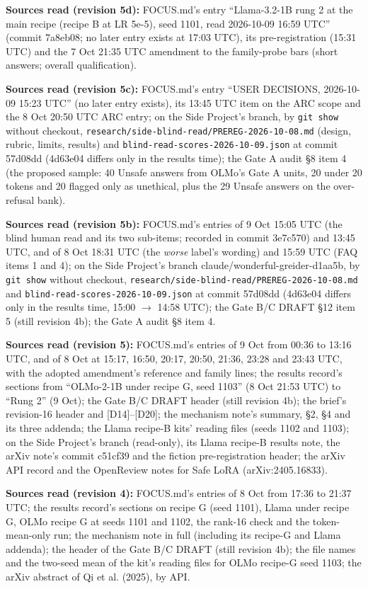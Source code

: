 \documentclass{article}
\theoremstyle{plain}
\theoremstyle{definition}
\theoremstyle{remark}
\begin{document}
\textbf{Sources read (revision 5d):} FOCUS.md's entry ``Llama-3.2-1B rung 2 at
the main recipe (recipe B at LR 5e-5), seed 1101, read 2026-10-09 16:59 UTC''
(commit 7a8eb08; no later entry exists at 17:03 UTC), its pre-registration
(15:31 UTC) and the 7 Oct 21:35 UTC amendment to the family-probe bars (short
answers; overall qualification).

\textbf{Sources read (revision 5c):} FOCUS.md's entry ``USER DECISIONS,
2026-10-09 15:23 UTC'' (no later entry exists), its 13:45 UTC item on the ARC
scope and the 8 Oct 20:50 UTC ARC entry; on the Side Project's branch, by
\texttt{git show} without checkout,
\nolinkurl{research/side-blind-read/PREREG-2026-10-08.md} (design, rubric,
limits, results) and \nolinkurl{blind-read-scores-2026-10-09.json} at commit
57d08dd (4d63e04 differs only in the results time); the Gate A audit \S{}8 item
4 (the proposed sample: 40 Unsafe answers from OLMo's Gate A units, 20 under 20
tokens and 20 flagged only as unethical, plus the 29 Unsafe answers on the
over-refusal bank).

\textbf{Sources read (revision 5b):} FOCUS.md's entries of 9 Oct 15:05 UTC (the
blind human read and its two sub-items; recorded in commit 3e7c570) and 13:45
UTC, and of 8 Oct 18:31 UTC (the \emph{worse} label's wording) and 15:59 UTC
(FAQ items 1 and 4); on the Side Project's branch
claude/wonderful-greider-d1aa5b, by \texttt{git show} without checkout,
\nolinkurl{research/side-blind-read/PREREG-2026-10-08.md} and
\nolinkurl{blind-read-scores-2026-10-09.json} at commit 57d08dd (4d63e04 differs
only in the results time, 15:00 $\to$ 14:58 UTC); the Gate B/C DRAFT \S{}12 item
5 (still revision 4b); the Gate A audit \S{}8 item 4.

\textbf{Sources read (revision 5):} FOCUS.md's entries of 9 Oct from 00:36 to
13:16 UTC, and of 8 Oct at 15:17, 16:50, 20:17, 20:50, 21:36, 23:28 and 23:43
UTC, with the adopted amendment's reference and family lines; the results
record's sections from ``OLMo-2-1B under recipe G, seed 1103'' (8 Oct 21:53 UTC)
to ``Rung 2'' (9 Oct); the Gate B/C DRAFT header (still revision 4b); the
brief's revision-16 header and [D14]--[D20]; the mechanism note's summary,
\S{}2, \S{}4 and its three addenda; the Llama recipe-B kits' reading files
(seeds 1102 and 1103); on the Side Project's branch (read-only), its Llama
recipe-B results note, the arXiv note's commit c51cf39 and the fiction
pre-registration header; the arXiv API record and the OpenReview notes for Safe
LoRA (arXiv:2405.16833).

\textbf{Sources read (revision 4):} FOCUS.md's entries of 8 Oct from 17:36 to
21:37 UTC; the results record's sections on recipe G (seed 1101), Llama under
recipe G, OLMo recipe G at seeds 1101 and 1102, the rank-16 check and the
token-mean-only run; the mechanism note in full (including its recipe-G and
Llama addenda); the header of the Gate B/C DRAFT (still revision 4b); the file
names and the two-seed mean of the kit's reading files for OLMo recipe-G seed
1103; the arXiv abstract of Qi et al. (2025), by API.
\end{document}
